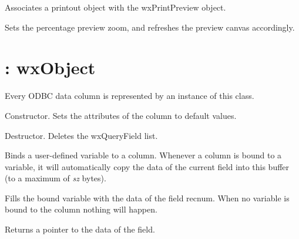 

Associates a printout object with the wxPrintPreview object.



Sets the percentage preview zoom, and refreshes the preview canvas
accordingly.



\section{: wxObject}\label{wxquerycol}


Every ODBC data column is represented by an instance of this class.



Constructor. Sets the attributes of the column to default values.



Destructor. Deletes the wxQueryField list.



Binds a user-defined variable to a column. Whenever a column is bound to a
variable, it will automatically copy the data of the current field into this
buffer (to a maximum of {\it sz} bytes).



Fills the bound variable with the data of the field recnum. When no variable
is bound to the column nothing will happen.



Returns a pointer to the data of the field.



